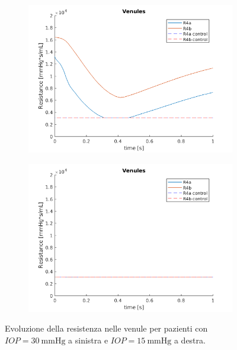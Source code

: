 \documentclass{article}
\begin{document}
\begin{figure}[h]
\begin{subfigure}{.5\textwidth}
  \centering
  \includegraphics[width=1.0\linewidth]{Pictures/IOP30_part1/venules_30.png}
\end{subfigure}
\begin{subfigure}{.5\textwidth}
  \centering
  \includegraphics[width=1.0\linewidth]{Pictures/IOP15_part1/venules_15.png}
\end{subfigure}
\caption{Evoluzione della resistenza nelle venule per pazienti con $IOP = \SI{30}{\mmHg}$ a sinistra e $IOP = \SI{15}{\mmHg}$ a destra.}
\label{venule1530}
\end{figure}
\end{document}

